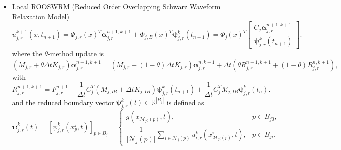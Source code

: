 \documentclass[a4paper, 11pt]{article}
\theoremstyle{remark}
\begin{document}
\begin{itemize}
\begin{equation*}
    \end{equation*}
    with
    \begin{equation*}
        R^{n+1, k+1}_{j, I} = F^{n+1}_{j, I} - \frac{1}{\Delta t}\left(M_{j, IB} +\Delta t K_{j, IB}\right)\boldsymbol{\psi}_{j}^{k}(t_{n+1}) + \frac{1}{\Delta t}M_{j, IB}\boldsymbol{\psi}_{j}^{k}(t_{n}),
    \end{equation*}
    and the boundary vector $\boldsymbol{\psi}_{j}^{k}(t) \in \mathbb{R}^{|B_j|}$ is defined as
    \begin{equation*}
        \boldsymbol{\psi}_{j}^{k}(t) = [\psi_{j}^{k}(x^{j}_{p}, t)]_{p\in B_{j}} = 
        \begin{cases}
            g(x_{\mathcal{M}_{j0}(p)}, t), & p\in B_{j0},\\[3pt]
            \dfrac{1}{\lvert \mathcal{N}_{j}(p)\rvert}\sum\limits_{i\in\mathcal{N}_{j}(p)}u^{k}_{i, h}(x^{i}_{\mathcal{M}_{ji}(p)}, t), & p\in B_{ji}.
        \end{cases}
    \end{equation*}
    \item [--] Local ROOSWRM (Reduced Order Overlapping Schwarz Waveform Relaxation Model)
    \begin{equation*}
    u^{k+1}_{j, r}(x, t_{n+1}) = \Phi_{j, r}(x)^{T}\boldsymbol{\alpha}_{j, r}^{n+1, k+1} + \Phi_{j, B}(x)^{T}\boldsymbol{\psi}_{j, r}^{k}(t_{n+1}) = \Phi_{j}(x)^{T}
    \begin{bmatrix}
        C_{j}\boldsymbol{\alpha}_{j, r}^{n+1, k+1}\\
        \boldsymbol{\psi}_{j, r}^{k}(t_{n+1})
    \end{bmatrix}.
    \end{equation*}
    where the $\theta$-method update is
    \begin{equation*}
        \left(M_{j, r} + \theta\Delta t K_{j, r}\right) \boldsymbol{\alpha}_{j, r}^{n+1, k+1} = \left(M_{j, r} - (1-\theta)\Delta t K_{j, r}\right)\boldsymbol{\alpha}_{j, r}^{n, k+1} + \Delta t\left(\theta R^{n+1, k+1}_{j, r} + (1-\theta)R^{n, k+1}_{j, r}\right),
    \end{equation*}
    with
    \begin{equation*}
        R^{n+1, k+1}_{j, r} = F^{n+1}_{j, r} - \frac{1}{\Delta t}C_{j}^{T}\left(M_{j, IB} +\Delta t K_{j, IB}\right)\boldsymbol{\psi}_{j, r}^{k}(t_{n+1}) + \frac{1}{\Delta t}C_{j}^{T}M_{j, IB}\boldsymbol{\psi}_{j, r}^{k}(t_{n}).
    \end{equation*}
    and the reduced boundary vector $\boldsymbol{\psi}_{j, r}^{k}(t) \in \mathbb{R}^{|B_j|}$ is defined as
    \begin{equation*}
        \boldsymbol{\psi}_{j, r}^{k}(t) = [\psi_{j, r}^{k}(x^{j}_{p}, t)]_{p\in B_{j}} = 
        \begin{cases}
            g(x_{\mathcal{M}_{j0}(p)}, t), & p\in B_{j0},\\[3pt]
            \dfrac{1}{\lvert \mathcal{N}_{j}(p)\rvert}\sum\limits_{i\in\mathcal{N}_{j}(p)}u^{k}_{i, r}(x^{i}_{\mathcal{M}_{ji}(p)}, t), & p\in B_{ji}.
        \end{cases}
    \end{equation*}
\end{itemize}
\end{document}
